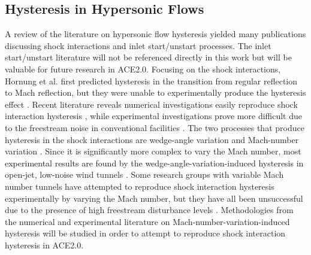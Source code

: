 \subsection{Hysteresis in Hypersonic Flows}
A review of the literature on hypersonic flow hysteresis yielded many publications discussing shock interactions and inlet start/unstart processes. The inlet start/unstart literature will not be referenced directly in this work but will be valuable for future research in ACE2.0. Focusing on the shock interactions, Hornung et al. \cite{hornung-1} first predicted hysteresis in the transition from regular reflection to Mach reflection, but they were unable to experimentally produce the hysteresis effect \cite{hornung-2}. Recent literature reveals numerical investigations easily reproduce shock interaction hysteresis \cite{chpoun-1,ivanov-3}, while experimental investigations prove more difficult due to the freestream noise in conventional facilities \cite{ben-dor-1,laguarda}. The two processes that produce hysteresis in the shock interactions are wedge-angle variation and Mach-number variation \cite{ben-dor-2}. Since it is significantly more complex to vary the Mach number, most experimental results are found by the wedge-angle-variation-induced hysteresis in open-jet, low-noise wind tunnels \cite{chpoun-2,li,ivanov-4,mouton,setoguchi,chanetz}. Some research groups with variable Mach number tunnels have attempted to reproduce shock interaction hysteresis experimentally by varying the Mach number, but they have all been unsuccessful due to the presence of high freestream disturbance levels \cite{durand,tao}. Methodologies from the numerical and experimental literature on Mach-number-variation-induced hysteresis will be studied in order to attempt to reproduce shock interaction hysteresis in ACE2.0.


